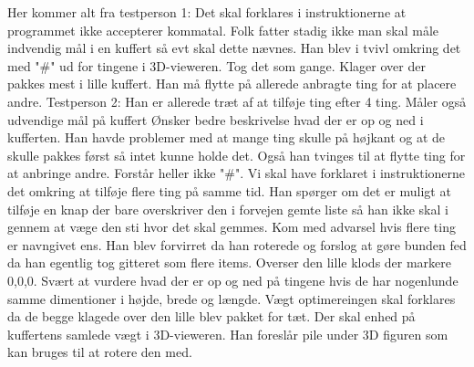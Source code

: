Her kommer alt fra testperson 1:
Det skal forklares i instruktionerne at programmet ikke accepterer kommatal. 
Folk fatter stadig ikke man skal måle indvendig mål i en kuffert så evt skal dette nævnes.
Han blev i tvivl omkring det med "#" ud for tingene i 3D-vieweren. Tog det som gange.
Klager over der pakkes mest i lille kuffert.
Han må flytte på allerede anbragte ting for at placere andre.
Testperson 2:
Han er allerede træt af at tilføje ting efter 4 ting.
Måler også udvendige mål på kuffert
Ønsker bedre beskrivelse hvad der er op og ned i kufferten.
Han havde problemer med at mange ting skulle på højkant og at de skulle pakkes først så intet kunne holde det.
Også han tvinges til at flytte ting for at anbringe andre.
Forstår heller ikke "#".
Vi skal have forklaret i instruktionerne det omkring at tilføje flere ting på samme tid.
Han spørger om det er muligt at tilføje en knap der bare overskriver den i forvejen gemte liste så han ikke skal i gennem at væge den sti hvor det skal gemmes.
Kom med advarsel hvis flere ting er navngivet ens.
Han blev forvirret da han roterede og forslog at gøre bunden fed da han egentlig tog gitteret som flere items.
Overser den lille klods der markere 0,0,0.
Svært at vurdere hvad der er op og ned på tingene hvis de har nogenlunde samme dimentioner i højde, brede og længde.
Vægt optimereingen skal forklares da de begge klagede over den lille blev pakket for tæt.
Der skal enhed på kuffertens samlede vægt i 3D-vieweren.
Han foreslår pile under 3D figuren som kan bruges til at rotere den med.